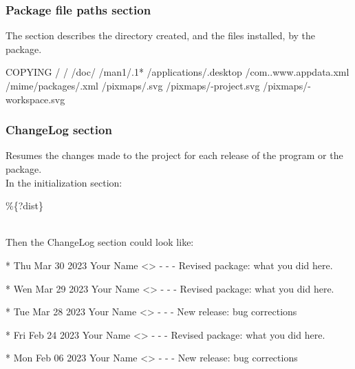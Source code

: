 \subsubsection{Package file paths section}
\label{rpmfiles}

The  section describes the directory created, and the files installed, by the package.
{\footnotesize{
\begin{script}
 COPYING
/
/
/doc/
/man1/.1*
/applications/.desktop
/com..www.appdata.xml
/mime/packages/.xml
/pixmaps/.svg
/pixmaps/-project.svg
/pixmaps/-workspace.svg
\end{script}
}}

\clearpage
\subsubsection{ChangeLog section}
\label{rpmlog}

Resumes the changes made to the project for each release of the program or the package. \\[0.25cm]
In the initialization section:
{\footnotesize{
\begin{script}
   
   \%\{?dist\}
\end{script}
}}
\\
\noindent Then the ChangeLog section could look like:
{\footnotesize{
\begin{script}
* Thu Mar 30 2023 Your Name <\email> - -
- Revised package: what you did here.

* Wen Mar 29 2023 Your Name <\email> - -
- Revised package: what you did here.

* Tue Mar 28 2023 Your Name <\email> - -
- New release: bug corrections

* Fri Feb 24 2023 Your Name <\email> - -
- Revised package: what you did here.

* Mon Feb 06 2023 Your Name <\email> - -
- New release: bug corrections
\end{script}
}}

